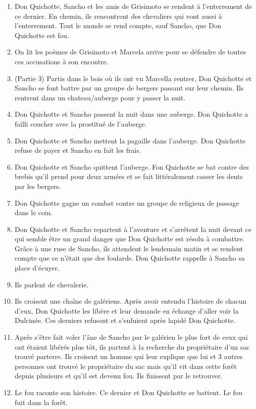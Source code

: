 \documentclass{article}
\begin{document}
\begin{enumerate}
    \item Don Quichotte, Sancho et les amis de Grisimoto se rendent à l'enterrement de ce dernier. En chemin, ils rencontrent des chevaliers qui vont aussi à l'enterrement. Tout le monde se rend compte, sauf Sancho, que Don Quichotte est fou.
    \item On lit les poèmes de Grisimoto et Marcela arrive pour se défendre de toutes ces accusations à son encontre.
    \item (Partie 3) Partis dans le bois où ils ont vu Marcella rentrer, Don Quichotte et Sancho se font battre par un groupe de bergers passant sur leur chemin. Ils rentrent dans un chateau/auberge pour y passer la nuit.
    \item Don Quichotte et Sancho passent la nuit dans une auberge. Don Quichotte a failli coucher avec la prostitué de l'auberge.
    \item Don Quichotte et Sancho mettent la pagaille dans l'auberge. Don Quichotte refuse de payer et Sancho en fait les frais.
    \item Don Quichotte et Sancho quittent l'auberge. Fon Quichotte se bat contre des brebis qu'il prend pour deux armées et se fait littéralement casser les dents par les bergers.
    \item Don Quichotte gagne un combat contre un groupe de religieux de passage dans le coin.
    \item Don Quichotte et Sancho repartent à l'aventure et s'arrêtent la nuit devant ce qui semble être un grand danger que Don Quichotte est résolu à combattre. Grâce à une ruse de Sancho, ils attendent le lendemain matin et se rendent compte que ce n'était que des foulards. Don Quichotte rappelle à Sancho sa place d'écuyer.
    \item Ils parlent de chevalerie.
    \item Ils croisent une chaîne de galériens. Après avoir entendu l'histoire de chacun d'eux, Don Quichotte les libère et leur demande en échange d'aller voir la Dulcinée. Ces derniers refusent et s'enfuient après lapidé Don Quichotte.
    \item Après s'être fait voler l'âne de Sancho par le galérien le plus fort de ceux qui ont étaient libérés plus tôt, ils partent à la recherche du propriétaire d'un sac trouvé parterre. Ils croisent un homme qui leur explique que lui et 3 autres personnes ont trouvé le propriétaire du sac mais qu'il vit dans cette forêt depuis plusieurs et qu'il est devenu fou. Ils finissent par le retrouver.
    \item Le fou raconte son histoire. Ce dernier et Don Quichotte se battent. Le fou fuit dans la forêt.

\end{enumerate}
\end{document}
